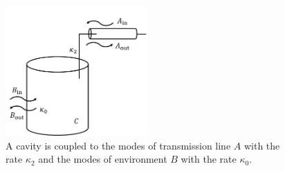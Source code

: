 \begin{figure}[htbp]
    \centering
    \includegraphics[width=0.48\textwidth]{figures/cavity_in_out.jpg}
    \caption{A cavity is coupled to the modes of transmission line $A$ with the 
rate $\kappa_2$ and the modes of environment $B$ with the rate $\kappa_0$.}
    \label{fig:cavity_in_out.jpg}
\end{figure}


